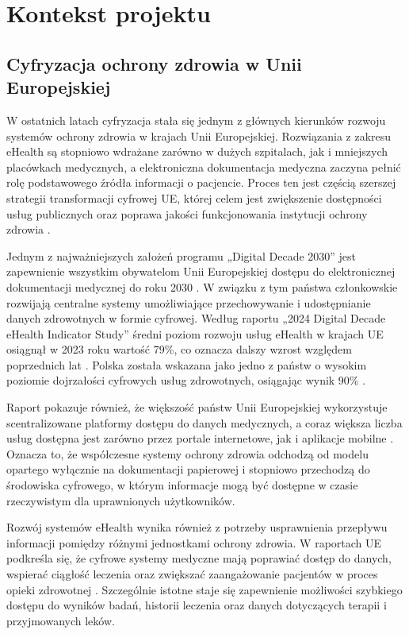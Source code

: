 \label{chapter:problem_analysis}

\section{Kontekst projektu}
\subsection{Cyfryzacja ochrony zdrowia w Unii Europejskiej}
W ostatnich latach cyfryzacja stała się jednym z głównych kierunków rozwoju systemów ochrony zdrowia w krajach Unii Europejskiej. Rozwiązania z zakresu eHealth są stopniowo wdrażane zarówno w dużych szpitalach, jak i mniejszych placówkach medycznych, a elektroniczna dokumentacja medyczna zaczyna pełnić rolę podstawowego źródła informacji o pacjencie. Proces ten jest częścią szerszej strategii transformacji cyfrowej UE, której celem jest zwiększenie dostępności usług publicznych oraz poprawa jakości funkcjonowania instytucji ochrony zdrowia \cite{EU_eHealth_2024}.

Jednym z najważniejszych założeń programu „Digital Decade 2030” jest zapewnienie wszystkim obywatelom Unii Europejskiej dostępu do elektronicznej dokumentacji medycznej do roku 2030 \cite{EU_eHealth_2024}. W związku z tym państwa członkowskie rozwijają centralne systemy umożliwiające przechowywanie i udostępnianie danych zdrowotnych w formie cyfrowej. Według raportu „2024 Digital Decade eHealth Indicator Study” średni poziom rozwoju usług eHealth w krajach UE osiągnął w 2023 roku wartość 79\%, co oznacza dalszy wzrost względem poprzednich lat \cite{EU_eHealth_2024}. Polska została wskazana jako jedno z państw o wysokim poziomie dojrzałości cyfrowych usług zdrowotnych, osiągając wynik 90\% \cite{EU_eHealth_2024}.

Raport pokazuje również, że większość państw Unii Europejskiej wykorzystuje scentralizowane platformy dostępu do danych medycznych, a coraz większa liczba usług dostępna jest zarówno przez portale internetowe, jak i aplikacje mobilne \cite{EU_eHealth_2024}. Oznacza to, że współczesne systemy ochrony zdrowia odchodzą od modelu opartego wyłącznie na dokumentacji papierowej i stopniowo przechodzą do środowiska cyfrowego, w którym informacje mogą być dostępne w czasie rzeczywistym dla uprawnionych użytkowników.

Rozwój systemów eHealth wynika również z potrzeby usprawnienia przepływu informacji pomiędzy różnymi jednostkami ochrony zdrowia. W raportach UE podkreśla się, że cyfrowe systemy medyczne mają poprawiać dostęp do danych, wspierać ciągłość leczenia oraz zwiększać zaangażowanie pacjentów w proces opieki zdrowotnej \cite{EU_eHealth_2024}. Szczególnie istotne staje się zapewnienie możliwości szybkiego dostępu do wyników badań, historii leczenia oraz danych dotyczących terapii i przyjmowanych leków.

